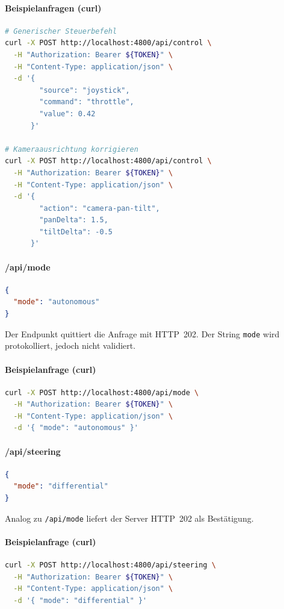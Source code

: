 \documentclass[a4paper,11pt]{article}
\begin{document}
\paragraph{Beispielanfragen (curl)}
\begin{lstlisting}[language=bash]
# Generischer Steuerbefehl
curl -X POST http://localhost:4800/api/control \
  -H "Authorization: Bearer ${TOKEN}" \
  -H "Content-Type: application/json" \
  -d '{
        "source": "joystick",
        "command": "throttle",
        "value": 0.42
      }'

# Kameraausrichtung korrigieren
curl -X POST http://localhost:4800/api/control \
  -H "Authorization: Bearer ${TOKEN}" \
  -H "Content-Type: application/json" \
  -d '{
        "action": "camera-pan-tilt",
        "panDelta": 1.5,
        "tiltDelta": -0.5
      }'
\end{lstlisting}

\paragraph{/api/mode}
\begin{lstlisting}[language=json]
{
  "mode": "autonomous"
}
\end{lstlisting}
Der Endpunkt quittiert die Anfrage mit HTTP~202. Der String \texttt{mode} wird protokolliert, jedoch nicht validiert.

\paragraph{Beispielanfrage (curl)}
\begin{lstlisting}[language=bash]
curl -X POST http://localhost:4800/api/mode \
  -H "Authorization: Bearer ${TOKEN}" \
  -H "Content-Type: application/json" \
  -d '{ "mode": "autonomous" }'
\end{lstlisting}

\paragraph{/api/steering}
\begin{lstlisting}[language=json]
{
  "mode": "differential"
}
\end{lstlisting}
Analog zu \texttt{/api/mode} liefert der Server HTTP~202 als Bestätigung.

\paragraph{Beispielanfrage (curl)}
\begin{lstlisting}[language=bash]
curl -X POST http://localhost:4800/api/steering \
  -H "Authorization: Bearer ${TOKEN}" \
  -H "Content-Type: application/json" \
  -d '{ "mode": "differential" }'
\end{lstlisting}
\end{document}
